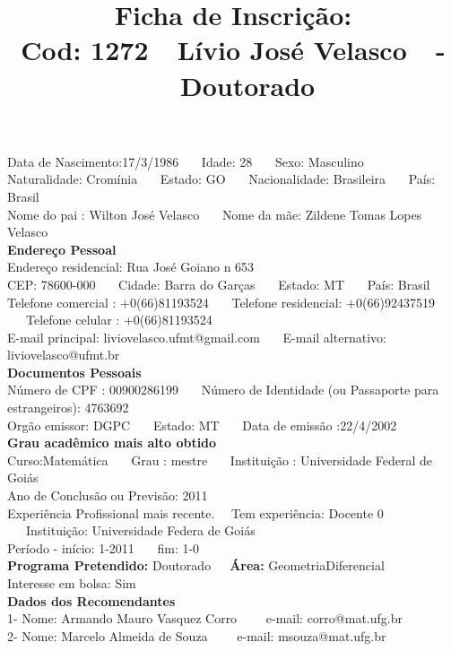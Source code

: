 \documentclass[11pt]{article}
\title{\vspace*{-4cm} Ficha de Inscrição: \\Cod: 1272\ \ Lívio José Velasco\ \ - \ \ Doutorado 
 }
\date{}
\begin{document}
\maketitle
\vspace*{-1.5cm}
\noindent Data de Nascimento:17/3/1986
\ \ \ Idade: 28   \ \ \ Sexo: Masculino
\\
Naturalidade: Cromínia  
\ \ \  Estado: GO
\ \ \  Nacionalidade: Brasileira
\ \ \ País: Brasil
\\        
Nome do pai : Wilton José Velasco
\ \ \ Nome da mãe: Zildene Tomas Lopes Velasco          
\\[0.2cm]                     
\textbf{Endereço Pessoal} 
\\ 
\noindent Endereço residencial: Rua José Goiano n 653
\\
        CEP: 78600-000 
\ \ \ Cidade: Barra do Garças 
\ \ \ Estado: MT 
\ \ \ País: Brasil
\\		
		Telefone comercial : +0(66)81193524
\ \ \ Telefone residencial: +0(66)92437519
\ \ \ Telefone celular : +0(66)81193524
\\
E-mail principal: liviovelasco.ufmt@gmail.com
\ \ \ E-mail alternativo: liviovelasco@ufmt.br 
\\[0.2cm] 
\textbf{Documentos Pessoais}
\\
\noindent Número de CPF : 00900286199
\ \ \ Número de Identidade (ou Passaporte para estrangeiros): 4763692
\\
Orgão emissor: DGPC
\ \ \ Estado: MT
\ \ \ Data de emissão :22/4/2002
\\[0.3cm]
\textbf{Grau acadêmico mais alto obtido}
\\	
Curso:Matemática
\ \ \ Grau : mestre
\ \ \ Instituição : Universidade Federal de Goiás
\\			
Ano de Conclusão ou Previsão: 2011
\\ 
Experiência Profissional mais recente. \ \  
Tem experiência: Docente 0  
\ \ \ Instituição: Universidade Federa de Goiás
\\  
Período - início: 1-2011
\ \ \ fim: 1-0
\\[0.2cm] 
\textbf{Programa Pretendido:} Doutorado\ \ \ \textbf{Área:} GeometriaDiferencial\\
Interesse em bolsa: Sim
\\[0.3cm]		
\textbf{Dados dos Recomendantes} 
\\
1- Nome: Armando Mauro Vasquez Corro
\ \ \ \  e-mail: corro@mat.ufg.br 
\\
2- Nome: Marcelo Almeida de Souza
\ \ \ \ e-mail: msouza@mat.ufg.br
\end{document}

